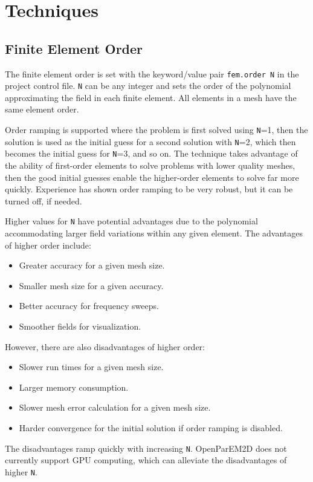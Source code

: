 \documentclass[titlepage]{article}
\renewcommand\_{\textunderscore\linebreak[1]}
\begin{document}
\section{Techniques}

\subsection{Finite Element Order}

The finite element order is set with the keyword/value pair \texttt{fem.order N} in the project control file.  \texttt{N} can be any integer and sets the order of the polynomial approximating the field in each finite element.  All elements in a mesh have the same element order.

Order ramping is supported where the problem is first solved using \texttt{N}=1, then the solution is used as the initial guess for a second solution with \texttt{N}=2, which then becomes the initial guess for \texttt{N}=3, and so on.  The technique takes advantage of the ability of first-order elements to solve problems with lower quality meshes, then the good initial guesses enable the higher-order elements to solve far more quickly.  Experience has shown order ramping to be very robust, but it can be turned off, if needed.

Higher values for \texttt{N} have potential advantages due to the polynomial accommodating larger field variations within any given element.  The advantages of higher order include:
\begin{itemize}
\item Greater accuracy for a given mesh size.
\item Smaller mesh size for a given accuracy.
\item Better accuracy for frequency sweeps.
\item Smoother fields for visualization.
\end{itemize}
\noindent However, there are also disadvantages of higher order:
\begin{itemize}
\item Slower run times for a given mesh size.
\item Larger memory consumption.
\item Slower mesh error calculation for a given mesh size.
\item Harder convergence for the initial solution if order ramping is disabled.
\end{itemize}
\noindent The disadvantages ramp quickly with increasing \texttt{N}.
OpenParEM2D does not currently support GPU computing, which can alleviate the disadvantages of higher \texttt{N}.
\end{document}
